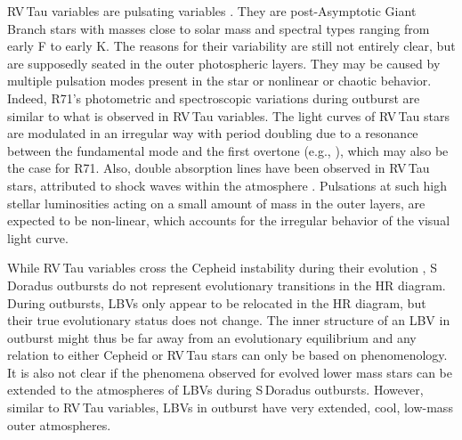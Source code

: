 \documentclass[structabstract]{aa}
\begin{document}
RV\,Tau variables are pulsating variables \citep{2007uvs..book.....P}. They are post-Asymptotic Giant Branch stars with masses close to solar mass and spectral types ranging from early F to early K. The reasons for their variability are still not entirely clear, but are supposedly seated in the outer photospheric layers. They may be caused by multiple pulsation modes present in the star or nonlinear or chaotic behavior. 
Indeed, R71's photometric and spectroscopic variations during outburst are similar to what is observed in RV\,Tau variables. The light curves of RV\,Tau stars are modulated in an irregular way with period doubling due to a resonance between the fundamental mode and the first overtone (e.g., \citealt{1983A&A...117..352T,1990ApJ...355..590M,1996MNRAS.279..949P}), which may also be the case for R71. Also, double absorption lines have been observed in RV\,Tau stars, attributed to shock waves within the atmosphere \citep{1989A&A...215..316G}.
Pulsations at such high stellar luminosities acting on a small amount of mass in the outer layers, are expected to be non-linear, which accounts for the irregular behavior of the visual light curve.


While RV\,Tau variables cross the Cepheid instability
during their evolution \citep{2002PASP..114..689W}, S\,Doradus outbursts do not represent evolutionary transitions in the HR diagram. During outbursts, LBVs only appear to be relocated in the HR diagram, but their true evolutionary status does not change. The inner structure of an LBV in outburst might thus be far away from an evolutionary equilibrium and any relation to either Cepheid or RV\,Tau stars can only be based on phenomenology.  It is also not clear if the phenomena observed for evolved lower mass stars can be extended to the atmospheres of LBVs during S\,Doradus outbursts. However, similar to RV\,Tau variables, LBVs in outburst have very extended, cool, low-mass outer atmospheres. 
\end{document}
